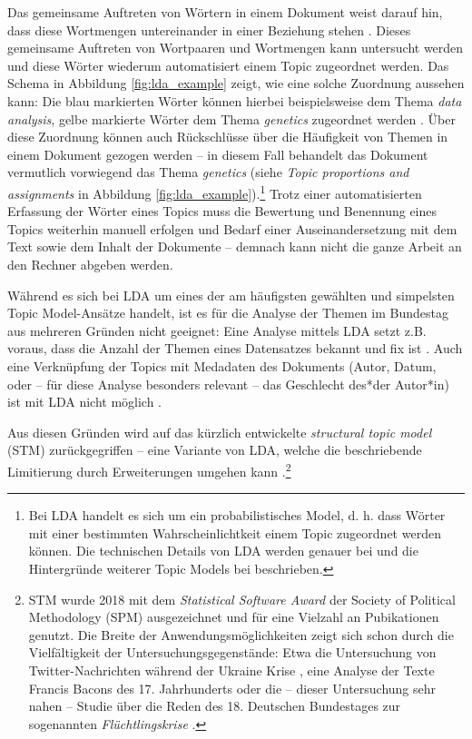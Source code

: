\documentclass[12pt, 
    twoside=false, 
    bibliography=totoc, 
    numbers=endperiod, 
    headings=normal, 
    toc=chapterentrydotfill
    ]{scrbook}
\begin{document}
Das gemeinsame Auftreten von Wörtern in einem Dokument weist darauf hin, dass diese Wortmengen untereinander in einer Beziehung stehen \parencite[90]{niekler_2018}. Dieses gemeinsame Auftreten von Wortpaaren und Wortmengen kann untersucht werden und diese Wörter wiederum automatisiert einem Topic zugeordnet werden. Das Schema in Abbildung \ref{fig:lda_example} zeigt, wie eine solche Zuordnung aussehen kann: Die blau markierten Wörter können hierbei beispielsweise dem Thema \emph{data analysis}, gelbe markierte Wörter dem Thema \emph{genetics} zugeordnet werden \parencite[vgl.][78]{blei_2012}. Über diese Zuordnung können auch Rückschlüsse über die Häufigkeit von Themen in einem Dokument gezogen werden -- in diesem Fall behandelt das Dokument vermutlich vorwiegend das Thema \emph{genetics} (siehe \emph{Topic proportions and assignments} in Abbildung \ref{fig:lda_example}).\footnote{Bei LDA handelt es sich um ein probabilistisches Model, d. h. dass Wörter mit einer bestimmten Wahrscheinlichtkeit einem Topic zugeordnet werden können. Die technischen Details von LDA werden genauer bei \textcite{blei_2012} und die Hintergründe weiterer Topic Models bei \textcite[87ff.]{niekler_2018} beschrieben.} Trotz einer automatisierten Erfassung der Wörter eines Topics muss die Bewertung und Benennung eines Topics weiterhin manuell erfolgen und Bedarf einer Auseinandersetzung mit dem Text sowie dem Inhalt der Dokumente -- demnach kann nicht die ganze Arbeit an den Rechner abgeben werden.

Während es sich bei LDA um eines der am häufigsten gewählten und simpelsten Topic Model-Ansätze handelt, ist es für die Analyse der Themen im Bundestag aus mehreren Gründen nicht geeignet:
Eine Analyse mittels LDA setzt z.B. voraus, dass die Anzahl der Themen eines Datensatzes bekannt und fix ist \parencites[93]{niekler_2018}[82f.]{blei_2012}. Auch eine Verknüpfung der Topics mit Medadaten des Dokuments (Autor, Datum, oder -- für diese Analyse besonders relevant -- das Geschlecht des*der Autor*in) ist mit LDA nicht möglich \parencites[94]{niekler_2018}[82f.]{blei_2012}. 

Aus diesen Gründen wird auf das kürzlich entwickelte \emph{structural topic model} (STM) zurückgegriffen -- eine Variante von LDA, welche die beschriebende Limitierung durch Erweiterungen umgehen kann \parencite[640]{mishler_2015}.\footnote{STM wurde 2018 mit dem \emph{Statistical Software Award} der {Society of Political Methodology} (SPM) ausgezeichnet und für eine Vielzahl an Pubikationen genutzt. Die Breite der Anwendungsmöglichkeiten zeigt sich schon durch die Vielfältigkeit der Untersuchungsgegenstände: Etwa die Untersuchung von Twitter-Nachrichten während der Ukraine Krise \parencite{mishler_2015}, eine Analyse der Texte Francis Bacons des 17. Jahrhunderts \parencite{grajzl_2019} oder die -- dieser Untersuchung sehr nahen -- Studie über die Reden des 18. Deutschen Bundestages zur sogenannten \emph{Flüchtlingskrise} \parencite{geese_2019}.}
\end{document}
